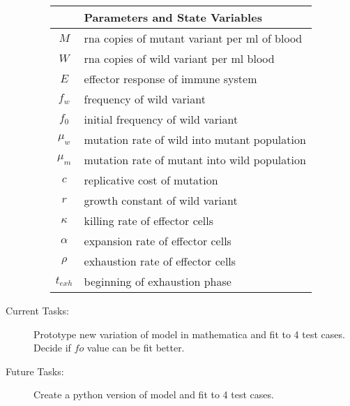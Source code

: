 \documentclass[letterpaper,index=totoc,hyperref,openany]{labbook} %
\begin{document}
\begin{description}
\begin{itemize}
\begin{table}[H]
\centering
\caption{}
\label{my-label}
\begin{tabular}{|l|l|}
\hline
                 & Parameters and State Variables               \\ \hline
$$M$$            & rna copies of mutant variant per ml of blood \\ \hline
$$W$$            & rna copies of wild variant per ml blood      \\ \hline
$$E$$            & effector response of immune system           \\ \hline
$$f_w$$          & frequency of wild variant                    \\ \hline
$$f_0$$          & initial frequency of wild variant            \\ \hline
$$\mu_w$$        & mutation rate of wild into mutant population \\ \hline
$$\mu_m$$        & mutation rate of mutant into wild population \\ \hline
$$c$$            & replicative cost of mutation                 \\ \hline
$$r$$            & growth constant of wild variant              \\ \hline
$$\kappa$$       & killing rate of effector cells               \\ \hline
$$\alpha$$       & expansion rate of effector cells             \\ \hline
$$\rho$$         & exhaustion rate of effector cells            \\ \hline
$$t_{exh}$$      & beginning of exhaustion phase                \\ \hline
\end{tabular}
\end{table}
    
    \end{itemize}
  \item[Current Tasks:]{ Prototype new variation of model in mathematica and fit to 4 test cases. Decide if $fo$ value can be fit better.}
  \item[Future Tasks:] {Create a python version of model and fit to 4 test cases.}
  \end{description}


\printbibliography
\end{document}
